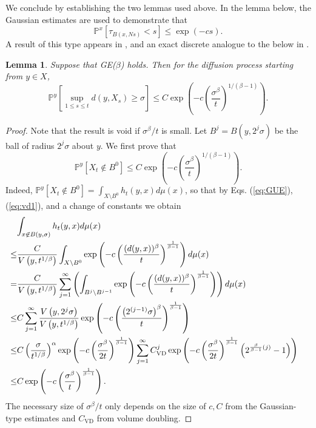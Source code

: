 \documentclass[letterpaper,oneside,english]{amsart}
\newtheorem{lem}{Lemma}
\begin{document}
 We conclude by establishing the two lemmas used above.  In the lemma below, the Gaussian estimates are used to demonstrate that 
 $$\mathbb{P}^x\left[\tau_{B\left(x,Ns\right)}<s\right] \le \exp(-cs).$$ A result of this type appears in \cite{LscHebisch0}, and an exact discrete analogue to the below in \cite{Gibson2}.
 \begin{lem}\label{lem:GaussianExercise}
   Suppose that \emph{GE($\beta$)}
holds. Then for the diffusion process starting from $y\in X$, \[
\mathbb{P}^{y}\left[\sup_{1\le s\le t}d\left(y,X_{s}\right)\ge\sigma\right]\le C\exp\left(-c\left(\frac{\sigma^{\beta}}{t}\right)^{1/(\beta-1)}\right).\]
\end{lem}
\begin{proof}
Note that the result is void if $\sigma^{\beta}/t$ is small. Let
$B^{j}=B\left(y,2^{j}\sigma\right)$ be the ball of radius $2^{j}\sigma$
about $y$. We first prove that \begin{equation}
\mathbb{P}^{y}\left[X_{t}\notin B^{0}\right]\leq C\exp\left(-c\left(\frac{\sigma^{\beta}}{t}\right)^{1/(\beta-1)}\right).\label{eq:escapedecay}\end{equation}
 Indeed, $\mathbb{P}^{y}\left[X_{t}\notin B^{0}\right]=\int_{X\setminus B^{0}}h_{t}(y,x)d\mu(x)$,
so that by Eqs. (\ref{eq:GUE}), (\ref{eq:vd1}), and a change of constants
we obtain\begin{align*}
\lefteqn{\int_{x\not\in B(y,\sigma)}h_{t}(y,x)d\mu(x)}\\
\leq & \frac{C}{V\left(y,t^{1/\beta}\right)}\int_{X\setminus B^{0}}\exp\left(-c\left(\frac{(d(y,x))^{\beta}}{t}\right)^{\frac{1}{\beta-1}}\right)d\mu(x)\\
= & \frac{C}{V\left(y,t^{1/\beta}\right)}\sum_{j=1}^{\infty}\left(\int_{B^{j}\setminus B^{j-1}}\exp\left(-c\left(\frac{(d(y,x))^{\beta}}{t}\right)^{\frac{1}{\beta-1}}\right)\right)d\mu(x)\\
\leq & C\sum_{j=1}^{\infty}\frac{V\left(y,2^{j}\sigma\right)}{V\left(y,t^{1/\beta}\right)}\exp\left(-c\left(\frac{\left(2^{(j-1)}\sigma\right)^{\beta}}{t}\right)^{\frac{1}{\beta-1}}\right)\\
\leq & C\left(\frac{\sigma}{t^{1/\beta}}\right)^{\alpha}\exp\left(-c\left(\frac{\sigma^{\beta}}{2t}\right)^{\frac{1}{\beta-1}}\right)\sum_{j=1}^{\infty}C_{\mathrm{VD}}^{j}\exp\left(-c\left(\frac{\sigma^{\beta}}{2t}\right)^{\frac{1}{\beta-1}}\left(2^{\frac{\beta}{\beta-1}\left(j\right)}-1\right)\right)\\
\leq & C\exp\left(-c\left(\frac{\sigma^{\beta}}{t}\right)^{\frac{1}{\beta-1}}\right).\end{align*}
The necessary size of $\sigma^{\beta}/t$ only depends on the size
of $c,C$ from the Gaussian-type estimates and $C_{\mathrm{VD}}$ from volume doubling.


\end{proof}
\end{document}
